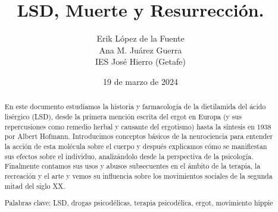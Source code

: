 \documentclass[a4paper, titlepage]{article}
\title{LSD, Muerte y Resurrección.}
\author{Erik López de la Fuente \\ Ana M. Juárez Guerra \\ IES José Hierro (Getafe)}
\date{19 de marzo de 2024}
\begin{document}
\maketitle

\begin{abstract}
En este documento estudiamos la historia y farmacología de la dietilamida del ácido lisérgico (LSD), desde la primera mención escrita del ergot en Europa (y sus repercusiones como remedio herbal y causante del ergotismo) hasta la síntesis en 1938 por Albert Hofmann. Introducimos conceptos básicos de la neurociencia para entender la acción de esta molécula sobre el cuerpo y después explicamos cómo se manifiestan sus efectos sobre el individuo, analizándolo desde la perspectiva de la psicología. Finalmente contamos sus usos y abusos subsecuentes en el ámbito de la terapia, la recreación y el arte y vemos su influencia sobre los movimientos sociales de la segunda mitad del siglo XX.

Palabras clave: LSD, drogas psicodélicas, terapia psicodélica, ergot, movimiento hippie
\end{abstract}



\tableofcontents

\newpage









\nocite{*}


\end{document}

